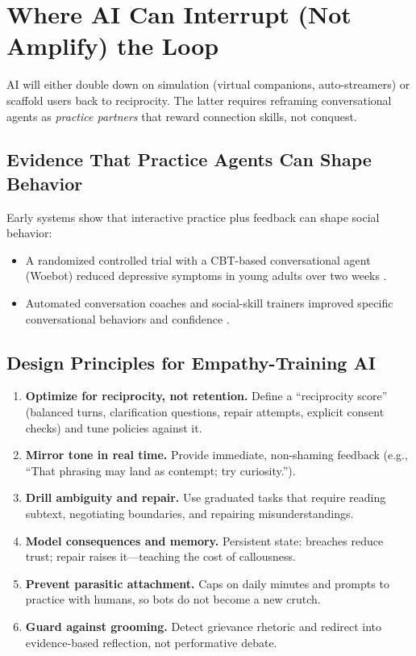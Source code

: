 \documentclass[12pt]{article}
\begin{document}
\section{Where AI Can Interrupt (Not Amplify) the Loop}

AI will either double down on simulation (virtual companions, auto-streamers) or scaffold users back to reciprocity. The latter requires reframing conversational agents as \emph{practice partners} that reward connection skills, not conquest.

\subsection{Evidence That Practice Agents Can Shape Behavior}
Early systems show that interactive practice plus feedback can shape social behavior:
\begin{itemize}
  \item A randomized controlled trial with a CBT-based conversational agent (Woebot) reduced depressive symptoms in young adults over two weeks \cite{fitzpatrick2017}.
  \item Automated conversation coaches and social-skill trainers improved specific conversational behaviors and confidence \cite{hoque2013,bickmore2009}.
\end{itemize}

\subsection{Design Principles for Empathy-Training AI}
\begin{enumerate}[label=\textbf{P\arabic*}.]
  \item \textbf{Optimize for reciprocity, not retention.} Define a ``reciprocity score'' (balanced turns, clarification questions, repair attempts, explicit consent checks) and tune policies against it.
  \item \textbf{Mirror tone in real time.} Provide immediate, non-shaming feedback (e.g., ``That phrasing may land as contempt; try curiosity.'').
  \item \textbf{Drill ambiguity and repair.} Use graduated tasks that require reading subtext, negotiating boundaries, and repairing misunderstandings.
  \item \textbf{Model consequences and memory.} Persistent state: breaches reduce trust; repair raises it---teaching the cost of callousness.
  \item \textbf{Prevent parasitic attachment.} Caps on daily minutes and prompts to practice with humans, so bots do not become a new crutch.
  \item \textbf{Guard against grooming.} Detect grievance rhetoric and redirect into evidence-based reflection, not performative debate.
\end{enumerate}
\end{document}
